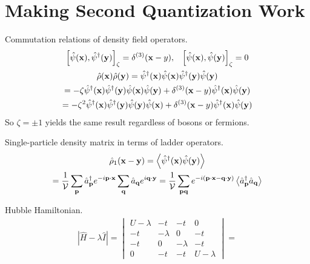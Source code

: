 \documentclass{report}
\begin{document}
\chapter{Making Second Quantization Work}

\begin{subquests}
	\item Commutation relations of density field operators.
	\begin{gather*}
		\bqty{\hat{\psi}\pqty{\vb x}, \hat{\psi}^{\dagger}\pqty{\vb y}}_{\zeta} = \delta^{\pqty{3}}\pqty{\vb x - y},\;\;\; \bqty{\hat{\psi}\pqty{\vb x}, \hat{\psi}\pqty{\vb y}}_{\zeta} = 0 \\
		\hat{\rho}\pqty{\vb x}\hat{\rho}\pqty{\vb y} = \hat{\psi}^{\dagger}\pqty{\vb x}\hat{\psi}\pqty{\vb x}\hat{\psi}^{\dagger}\pqty{\vb y}\hat{\psi}\pqty{\vb y} \\
		= -\zeta\hat{\psi}^{\dagger}\pqty{\vb x}\hat{\psi}^{\dagger}\pqty{\vb y}\hat{\psi}\pqty{\vb x}\hat{\psi}\pqty{\vb y} + \delta^{\pqty{3}}\pqty{\vb x - y}\hat{\psi}^{\dagger}\pqty{\vb x}\hat{\psi}\pqty{\vb y} \\
		= -\zeta^2\hat{\psi}^{\dagger}\pqty{\vb x}\hat{\psi}^{\dagger}\pqty{\vb y}\hat{\psi}\pqty{\vb y}\hat{\psi}\pqty{\vb x} + \delta^{\pqty{3}}\pqty{\vb x - y}\hat{\psi}^{\dagger}\pqty{\vb x}\hat{\psi}\pqty{\vb y}
	\end{gather*}
	So $\zeta = \pm 1$ yields the same result regardless of bosons or fermions.

	\item Single-particle density matrix in terms of ladder operators.
	\begin{gather*}
		\hat{\rho}_1\pqty{\vb x - \vb y} = \expval{\hat{\psi}^{\dagger}\pqty{\vb x}\hat{\psi}\pqty{\vb y}} \\
		= \frac{1}{\cal{V}}\sum_{\vb p}\hat{a}_{\vb p}^{\dagger}e^{-i\vb p\cdot \vb x}\sum_{\vb q}\hat{a}_{\vb q}e^{i\vb q\cdot \vb y} = \frac{1}{\cal{V}}\sum_{\vb{pq}}e^{-i\pqty{\vb p\cdot \vb x - \vb q\cdot \vb y}}\expval{\hat{a}_{\vb p}^{\dagger}\hat{a}_{\vb q}}
	\end{gather*}

	\item Hubble Hamiltonian.
	\begin{gather*}
		|\hat{H} - \lambda\hat{I}| = \begin{vmatrix}
			U - \lambda & -t & -t & 0 \\
			-t & -\lambda & 0 & -t \\
			-t & 0 & -\lambda & -t \\
			0 & -t & -t & U - \lambda
		\end{vmatrix}
		= 
	\end{gather*}
\end{subquests}
\end{document}
